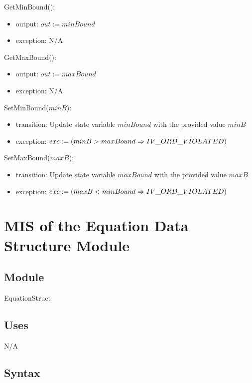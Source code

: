 \documentclass[12pt, titlepage]{article}
\begin{document}
\noindent GetMinBound():
\begin{itemize}
	\item output: $out := minBound$
	\item exception: N/A
\end{itemize}

\noindent GetMaxBound():
\begin{itemize}
	\item output: $out := maxBound$
	\item exception: N/A
\end{itemize}

\noindent SetMinBound($minB$):
\begin{itemize}
	\item transition: Update state variable $minBound$ with the provided value 
	$minB$
	\item exception: $exc := \\
	(minB > maxBound \Rightarrow IV\_ORD\_VIOLATED)$
\end{itemize}

\noindent SetMaxBound($maxB$):
\begin{itemize}
	\item transition: Update state variable $maxBound$ with the provided value 
	$maxB$
	\item exception: $exc := \\
	(maxB < minBound \Rightarrow IV\_ORD\_VIOLATED)$
\end{itemize}

\newpage

\section{MIS of the Equation Data Structure Module} 
\label{Module_equationdatastructure}

\subsection{Module}

EquationStruct

\subsection{Uses}

N/A

\subsection{Syntax}
\end{document}
